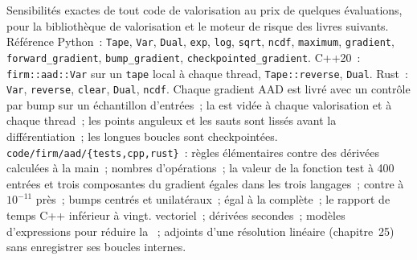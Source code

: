 \begin{build}
 Sensibilités exactes de tout code de valorisation au prix de quelques évaluations, pour la bibliothèque de valorisation et le moteur de risque des livres suivants.
 Référence Python~: \texttt{Tape}, \texttt{Var}, \texttt{Dual}, \texttt{exp}, \texttt{log}, \texttt{sqrt}, \texttt{ncdf}, \texttt{maximum}, \texttt{gradient}, \texttt{forward\_gradient},
\texttt{bump\_gradient}, \texttt{checkpointed\_gradient}. C++20~: \texttt{firm::aad::Var} sur un \texttt{tape} local à chaque thread, \texttt{Tape::reverse}, \texttt{Dual}. Rust~: \texttt{Var}, \texttt{reverse},
\texttt{clear}, \texttt{Dual}, \texttt{ncdf}.
 Chaque gradient AAD est livré avec un contrôle par bump sur un échantillon d'entrées~; la  est vidée à chaque valorisation et à chaque thread~; les points anguleux et les sauts sont lissés avant la différentiation~; les longues boucles sont
checkpointées.
 \texttt{code/firm/aad/\{tests,cpp,rust\}}~: règles élémentaires contre des dérivées calculées à la main~; nombres d'opérations~; la valeur de la fonction test à 400 entrées et trois composantes du gradient
égales dans les trois langages~;  contre  à $10^{-11}$ près~; bumps centrés et unilatéraux~;  égal à la  complète~; le rapport de temps C++ inférieur à vingt.
  vectoriel~; dérivées secondes~; modèles d'expressions pour réduire la ~; adjoints d'une résolution linéaire (chapitre~25) sans enregistrer ses boucles internes.
\end{build}

